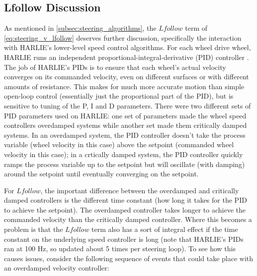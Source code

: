 \subsection{Lfollow Discussion}\label{subsec:lfollow_discussion_steering}

As mentioned in \autoref{subsec:steering_algorithms}, the $Lfollow$ term of \eqref{eq:steering_v_lfollow} deserves further discussion, specifically the interaction with HARLIE's lower-level speed control algorithms. For each wheel drive wheel, HARLIE runs an independent proportional-integral-derivative (PID) controller . The job of HARLIE's PIDs is to ensure that each wheel's actual velocity converges on its commanded velocity, even on different surfaces or with different amounts of resistance. This makes for much more accurate motion than simple open-loop control (essentially just the proportional part of the PID), but is sensitive to tuning of the P, I and D parameters. There were two different sets of PID parameters used on HARLIE: one set of parameters made the wheel speed controllers overdamped systems while another set made them critically damped systems. In an overdamped system, the PID controller doesn't take the process variable (wheel velocity in this case) above the setpoint (commanded wheel velocity in this case); in a crtically damped system, the PID controller quickly ramps the process variable up to the setpoint but will oscillate (with damping) around the setpoint until eventually converging on the setpoint.

For $Lfollow$, the important difference between the overdamped and critically damped controllers is the different time constant (how long it takes for the PID to achieve the setpoint). The overdamped controller takes longer to achieve the commanded velocity than the critically damped controller. Where this becomes a problem is that the $Lfollow$ term also has a sort of integral effect if the time constant on the underlying speed controller is long (note that HARLIE's PIDs ran at 100 Hz, so updated about 5 times per steering loop). To see how this causes issues, consider the following sequence of events that could take place with an overdamped velocity controller:

